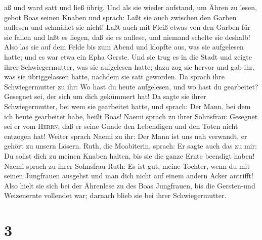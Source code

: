 aß und ward satt und ließ übrig.  Und als sie wieder
aufstand, um Ähren zu lesen, gebot Boas seinen Knaben und sprach: Laßt
sie auch zwischen den Garben auflesen und schmähet sie nicht!
 Laßt auch mit Fleiß etwas von den Garben für sie fallen
und laßt es liegen, daß sie es auflese, und niemand schelte sie deshalb!
 Also las sie auf dem Felde bis zum Abend und klopfte
aus, was sie aufgelesen hatte; und es war etwa ein Epha Gerste.
 Und sie trug es in die Stadt und zeigte ihrer
Schwiegermutter, was sie aufgelesen hatte; dazu zog sie hervor und gab
ihr, was sie übriggelassen hatte, nachdem sie satt geworden.
 Da sprach ihre Schwiegermutter zu ihr: Wo hast du heute
aufgelesen, und wo hast du gearbeitet? Gesegnet sei, der sich um dich
gekümmert hat! Da sagte sie ihrer Schwiegermutter, bei wem sie
gearbeitet hatte, und sprach: Der Mann, bei dem ich heute gearbeitet
habe, heißt Boas! Naemi sprach zu ihrer Sohnsfrau: 
Gesegnet sei er vom \textsc{Herrn}, daß er seine Gnade den Lebendigen
und den Toten nicht entzogen hat! Weiter sprach Naemi zu ihr: Der Mann
ist uns nah verwandt, er gehört zu unsern Lösern. Ruth, die Moabiterin,
sprach:  Er sagte auch das zu mir: Du sollst dich zu
meinen Knaben halten, bis sie die ganze Ernte beendigt haben!
 Naemi sprach zu ihrer Sohnsfrau Ruth: Es ist gut, meine
Tochter, wenn du mit seinen Jungfrauen ausgehst und man dich nicht auf
einem andern Acker antrifft!  Also hielt sie sich bei der
Ährenlese zu des Boas Jungfrauen, bis die Gersten-und Weizenernte
vollendet war; darnach blieb sie bei ihrer Schwiegermutter.

\hypertarget{section-2}{%
\section{3}\label{section-2}}

